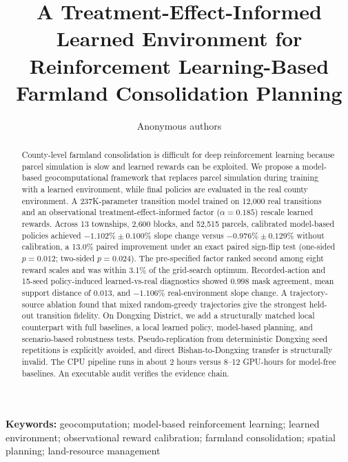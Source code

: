 \documentclass[11pt]{article}
\begin{document}
\title{A Treatment-Effect-Informed Learned Environment for Reinforcement Learning-Based Farmland Consolidation Planning}

\author{Anonymous authors}

\date{}
\maketitle

\begin{abstract}
County-level farmland consolidation is difficult for deep reinforcement learning because parcel simulation is slow and learned rewards can be exploited. We propose a model-based geocomputational framework that replaces parcel simulation during training with a learned environment, while final policies are evaluated in the real county environment. A 237K-parameter transition model trained on 12{,}000 real transitions and an observational treatment-effect-informed factor ($\alpha=0.185$) rescale learned rewards. Across 13 townships, 2{,}600 blocks, and 52{,}515 parcels, calibrated model-based policies achieved $-1.102\% \pm 0.100\%$ slope change versus $-0.976\% \pm 0.129\%$ without calibration, a 13.0\% paired improvement under an exact paired sign-flip test (one-sided $p=0.012$; two-sided $p=0.024$). The pre-specified factor ranked second among eight reward scales and was within 3.1\% of the grid-search optimum. Recorded-action and 15-seed policy-induced learned-vs-real diagnostics showed 0.998 mask agreement, mean support distance of 0.013, and $-1.106\%$ real-environment slope change. A trajectory-source ablation found that mixed random-greedy trajectories give the strongest held-out transition fidelity. On Dongxing District, we add a structurally matched local counterpart with full baselines, a local learned policy, model-based planning, and scenario-based robustness tests. Pseudo-replication from deterministic Dongxing seed repetitions is explicitly avoided, and direct Bishan-to-Dongxing transfer is structurally invalid. The CPU pipeline runs in about 2 hours versus 8--12 GPU-hours for model-free baselines. An executable audit verifies the evidence chain.
\end{abstract}

\noindent\textbf{Keywords:} geocomputation; model-based reinforcement learning; learned environment; observational reward calibration; farmland consolidation; spatial planning; land-resource management


\end{document}
